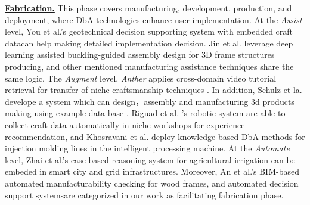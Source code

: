 \textbf{\underline{Fabrication.}}
This phase covers manufacturing, development, production, and deployment, where DbA technologies enhance user implementation. At the \textit{Assist} level, You et al.'s geotechnical decision supporting system with embedded craft data\cite{you2018design}can help making detailed implementation decision. Jin et al. leverage deep learning assisted buckling-guided assembly design for 3D frame structures producing\cite{jin2023deep}, and other mentioned manufacturing assistance techniques\cite{hong2024fishbone, dimassi2023knowledge, yu2014adaptive} share the same logic. The \textit{Augment} level, \textit{Anther} applies cross-domain video tutorial retrieval for transfer of niche craftsmanship techniques
\cite{emerson2024anther}. In addition, Schulz et la. develope a system which can design，assembly and manufacturing 3d products making using example data base \cite{schulz2014design}. Riguad et al. 's robotic system are able to collect craft data automatically in niche workshops for experience recommendation\cite{rigaud2022exploring}, and Khosravani et al. deploy knowledge-based DbA methods for injection molding lines in the intelligent processing machine\cite{khosravani2022intelligent}. At the \textit{Automate} level, Zhai et al.'s case based reasoning system for agricultural irrigation can be embeded in smart city and grid infrastructures\cite{zhai2020applying}. Moreover, An et al.'s BIM-based automated manufacturability checking for wood frames\cite{an2020bim}, and automated decision support systems\cite{gonzalez2018energy, zhang2020deep, lupiani2017monitoring}are categorized in our work as facilitating fabrication phase.


